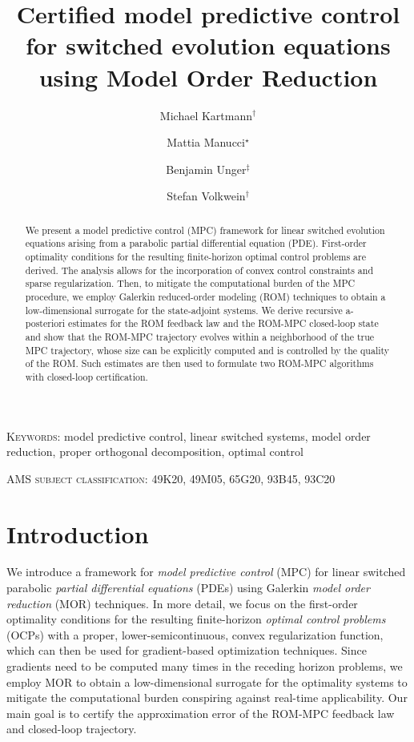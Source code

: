 \documentclass[reqno]{amsart}
\title[Certified MPC for switched evolution equations using MOR]{Certified model predictive control for switched evolution equations using Model Order Reduction}
\author[M.~Kartmann \and M.~Manucci \and B.~Unger \and S. Volkwein]{Michael Kartmann${}^{\dagger}$ \and Mattia Manucci${}^\star$ \and Benjamin Unger${}^\ddagger$ \and Stefan Volkwein${}^\dagger$}
\newcommand{\abbr}[1]{\textsf{#1}\xspace}
\newcommand{\PDE}{\abbr{PDE}}
\newcommand{\ROM}{\abbr{ROM}}
\newcommand{\MPC}{\abbr{MPC}}
\newcommand{\MOR}{\abbr{MOR}}
\newcommand{\OCPs}{\abbr{OCPs}}
\begin{document}
\begin{abstract}
	We present a model predictive control (\MPC) framework for linear switched evolution equations arising from a parabolic partial differential equation (\PDE). First-order optimality conditions for the resulting finite-horizon optimal control problems are derived. The analysis allows for the incorporation of convex control constraints and sparse regularization. 
    Then, to mitigate the computational burden of the \MPC procedure, we employ Galerkin reduced-order modeling (\ROM) techniques to obtain a low-dimensional surrogate for the state-adjoint systems. We derive recursive a-posteriori estimates for the \ROM feedback law and the \ROM-\MPC closed-loop state and show that the \ROM-\MPC trajectory evolves within a neighborhood of the true \MPC trajectory, whose size can be explicitly computed and is controlled by the quality of the \ROM. Such estimates are then used to formulate two \ROM-\MPC algorithms with closed-loop certification.
\end{abstract}

\maketitle
{\footnotesize \textsc{Keywords:} model predictive control, linear switched systems, model order reduction, proper orthogonal decomposition, optimal control}

{\footnotesize \textsc{AMS subject classification:} 49K20, 49M05, 65G20, 93B45, 93C20}


\section{Introduction}
\label{sec:intro}
%
We introduce a framework for \emph{model predictive control} (\MPC) for linear switched parabolic \emph{partial differential equations} ({\PDE}s) using Galerkin \emph{model order reduction} (\MOR) techniques. In more detail, we focus on the first-order optimality conditions for the resulting finite-horizon \emph{optimal control problems} (\OCPs) with a proper, lower-semicontinuous, convex regularization function, which can then be used for gradient-based optimization techniques. Since gradients need to be computed many times in the receding horizon problems, we employ \MOR to obtain a low-dimensional surrogate for the optimality systems to mitigate the computational burden conspiring against real-time applicability. Our main goal is to certify the approximation error of the \ROM-\MPC feedback law and closed-loop trajectory. 
%
\end{document}

